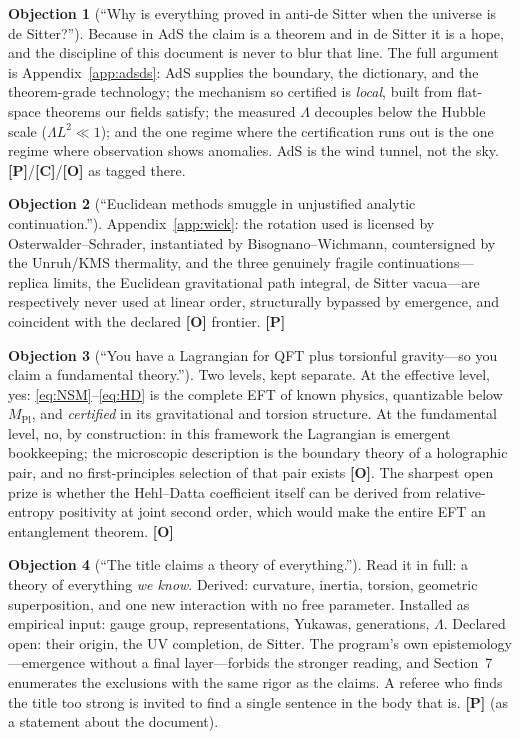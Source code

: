 \documentclass[11pt]{article}
\theoremstyle{definition}
\newtheorem{objection}{Objection}[section]
\newcommand{\pP}{\textbf{[P]}}
\newcommand{\pC}{\textbf{[C]}}
\newcommand{\pO}{\textbf{[O]}}
\begin{document}
\begin{objection}[``Why is everything proved in anti-de Sitter when the
universe is de Sitter?'']
Because in AdS the claim is a theorem and in de Sitter it is a hope, and
the discipline of this document is never to blur that line. The full
argument is Appendix~\ref{app:adsds}: AdS supplies the boundary, the
dictionary, and the theorem-grade technology; the mechanism so certified
is \emph{local}, built from flat-space theorems our fields satisfy; the
measured $\Lambda$ decouples below the Hubble scale
($\Lambda L^2\ll1$); and the one regime where the certification runs
out is the one regime where observation shows anomalies. AdS is the wind
tunnel, not the sky. \pP{}/\pC{}/\pO{} as tagged there.
\end{objection}

\begin{objection}[``Euclidean methods smuggle in unjustified analytic
continuation.'']
Appendix~\ref{app:wick}: the rotation used is licensed by
Osterwalder--Schrader, instantiated by Bisognano--Wichmann,
countersigned by the Unruh/KMS thermality, and the three genuinely fragile
continuations---replica limits, the Euclidean gravitational path integral,
de Sitter vacua---are respectively never used at linear order,
structurally bypassed by emergence, and coincident with the declared
\pO{} frontier. \pP{}
\end{objection}

\begin{objection}[``You have a Lagrangian for QFT plus torsionful
gravity---so you claim a fundamental theory.'']
Two levels, kept separate. At the effective level, yes:
\eqref{eq:NSM}--\eqref{eq:HD} is the complete EFT of known physics,
quantizable below $M_{\mathrm{Pl}}$, and \emph{certified} in its
gravitational and torsion structure. At the fundamental level, no, by
construction: in this framework the Lagrangian is emergent bookkeeping;
the microscopic description is the boundary theory of a holographic pair,
and no first-principles selection of that pair exists \pO{}. The sharpest
open prize is whether the Hehl--Datta coefficient itself can be derived
from relative-entropy positivity at joint second order, which would make
the entire EFT an entanglement theorem. \pO{}
\end{objection}

\begin{objection}[``The title claims a theory of everything.'']
Read it in full: a theory of everything \emph{we know}. Derived:
curvature, inertia, torsion, geometric superposition, and one new
interaction with no free parameter. Installed as empirical input: gauge
group, representations, Yukawas, generations, $\Lambda$. Declared open:
their origin, the UV completion, de Sitter. The program's own
epistemology---emergence without a final layer---forbids the stronger
reading, and Section~7 enumerates the exclusions with the same rigor as
the claims. A referee who finds the title too strong is invited to find a
single sentence in the body that is. \pP{} (as a statement about the
document).
\end{objection}
\end{document}
